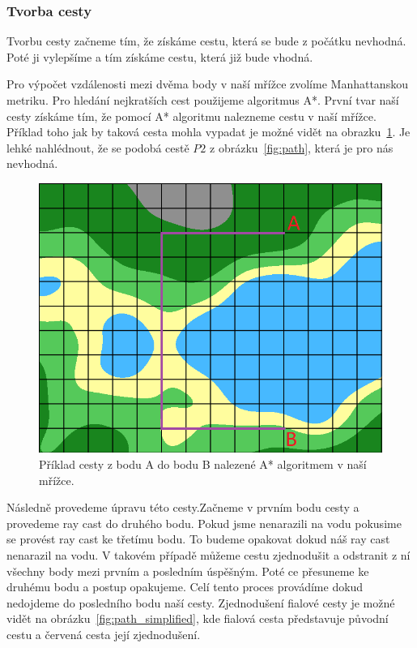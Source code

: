 \subsubsection{Tvorba cesty}
Tvorbu cesty začneme tím, že získáme cestu, která se bude z počátku nevhodná. Poté ji vylepšíme a tím získáme cestu, která již bude vhodná.

Pro výpočet vzdálenosti mezi dvěma body v naší mřížce zvolíme Manhattanskou metriku. Pro hledání nejkratších cest použijeme algoritmus A*. První tvar naší cesty získáme tím, že pomocí A* algoritmu nalezneme cestu v naší mřížce. Příklad toho jak by taková cesta mohla vypadat je možné vidět na obrazku~\ref{fig:path_grid}. Je lehké nahlédnout, že se podobá cestě $P2$ z obrázku~\ref{fig:path}, která je pro nás nevhodná.

\begin{figure}[!htb]
    \centering
    \includegraphics[width=0.66\linewidth]{img/path_grid.png}
    \caption{Příklad cesty z bodu A do bodu B nalezené A* algoritmem v naší mřížce.}
    \label{fig:path_grid}
\end{figure}

Následně provedeme úpravu této cesty.Začneme v prvním bodu cesty a provedeme ray cast do druhého bodu. Pokud jsme nenarazili na vodu pokusime se provést ray cast ke třetímu bodu. To budeme opakovat dokud náš ray cast nenarazil na vodu. V takovém případě můžeme cestu zjednodušit a odstranit z ní všechny body mezi prvním a posledním úspěšným. Poté ce přesuneme ke druhému bodu a postup opakujeme. Celí tento proces provádíme dokud nedojdeme do posledního bodu naší cesty. Zjednodušení fialové cesty je možné vidět na obrázku~\ref{fig:path_simplified}, kde fialová cesta představuje původní cestu a červená cesta její zjednodušení.

